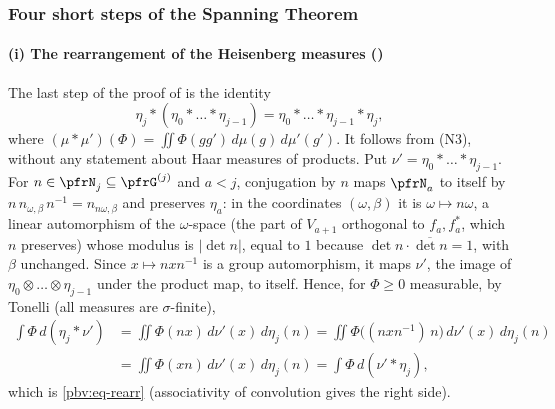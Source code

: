 \documentclass[10pt]{amsart}
\theoremstyle{definition}
\theoremstyle{remark}
\providecommand{\aubar}[1]{\overline{#1}}
\begin{document}
\subsubsection{Four short steps of the Spanning Theorem}\label{pbv:ss-weak}

\paragraph*{(i) The rearrangement of the Heisenberg measures ({\cite[Lemma~2.41]{P52}})}
The last step of the proof of {\cite[Lemma~2.41]{P52}} is the identity
\begin{equation}\label{pbv:eq-rearr}
\eta_j*(\eta_0*\dots*\eta_{j-1})=\eta_0*\dots*\eta_{j-1}*\eta_j ,
\end{equation}
where $(\mu*\mu')(\Phi)=\iint\Phi(gg')\,d\mu(g)\,d\mu'(g')$. It follows from (N3), without any statement
about Haar measures of products. Put $\nu'=\eta_0*\dots*\eta_{j-1}$. For $n\in\pfrN_j\subseteq\pfrG^{(j)}$
and $a<j$, conjugation by $n$ maps $\pfrN_a$ to itself by $n\,n_{\omega,\beta}\,n^{-1}=n_{n\omega,\beta}$ and
preserves $\eta_a$: in the coordinates $(\omega,\beta)$ it is $\omega\mapsto n\omega$, a linear automorphism of the
$\omega$-space (the part of $V_{a+1}$ orthogonal to $f_a,f_a^*$, which $n$ preserves) whose modulus is
$|\det n|$, equal to $1$ because $\det n\cdot\aubar{\det n}=1$, with $\beta$ unchanged. Since $x\mapsto nxn^{-1}$ is
a group automorphism, it maps $\nu'$, the image of $\eta_0\otimes\dots\otimes\eta_{j-1}$ under the product
map, to itself. Hence, for $\Phi\ge0$ measurable, by Tonelli (all measures are $\sigma$-finite),
\[
\begin{aligned}\int\Phi\,d(\eta_j*\nu')&=\iint\Phi(nx)\,d\nu'(x)\,d\eta_j(n)=\iint\Phi\bigl((nxn^{-1})\,n\bigr)\,d\nu'(x)\,
d\eta_j(n)\\&=\iint\Phi(xn)\,d\nu'(x)\,d\eta_j(n)=\int\Phi\,d(\nu'*\eta_j),\end{aligned}
\]
which is \eqref{pbv:eq-rearr} (associativity of convolution gives the right side).
\end{document}
